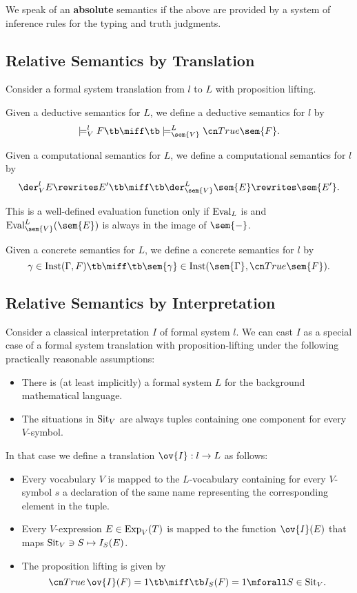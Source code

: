 We speak of an \textbf{absolute} semantics if the above are provided by a system of inference rules for the typing and truth judgments.

\subsection{Relative Semantics by Translation}

Consider a formal system translation from $l$ to $L$ with proposition lifting.

\begin{definition}
Given a deductive semantics for $L$, we define a deductive semantics for $l$ by
\[\models^l_V F \tb\miff\tb \models^L_{\sem{V}}\truelift\sem{F}.\]
\end{definition}

\begin{definition}
Given a computational semantics for $L$, we define a computational semantics for $l$ by
\[\der^l_V E\rewrites E' \tb\miff\tb \der^L_{\sem{V}} \sem{E}\rewrites \sem{E'}.\]

This is a well-defined evaluation function only if $\mathrm{Eval}_L$ is and $\Eval^L_{\sem{V}}(\sem{E})$ is always in the image of $\sem{-}$.
\end{definition}

\begin{definition}
Given a concrete semantics for $L$, we define a concrete semantics for $l$ by
\[\gamma\in \Inst(\Gamma,F) \tb\miff\tb \sem{\gamma}\in\Inst(\sem{\Gamma},\truelift\sem{F}).\]
\end{definition}

\subsection{Relative Semantics by Interpretation}

Consider a classical interpretation $I$ of formal system $l$.
We can cast $I$ as a special case of a formal system translation with proposition-lifting under the following practically reasonable assumptions:
\begin{itemize}
\item There is (at least implicitly) a formal system $L$ for the background mathematical language.
\item The situations in $\mathrm{Sit}_V$ are always tuples containing one component for every $V$-symbol.
\end{itemize}

In that case we define a translation $\ov{I}:l\to L$ as follows:
\begin{itemize}
\item Every vocabulary $V$ is mapped to the $L$-vocabulary containing for every $V$-symbol $s$ a declaration of the same name representing the corresponding element in the tuple.
\item Every $V$-expression $E\in\mathrm{Exp}_V(T)$ is mapped to the function $\ov{I}(E)$ that maps $\mathrm{Sit}_V\ni S \mapsto I_S(E)$.
\item The proposition lifting is given by \[\truelift\, \ov{I}(F) = 1 \tb\miff \tb I_S(F)=1 \mforall S\in\Sit_V.\]
\end{itemize}

